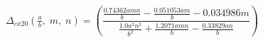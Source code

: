 \documentclass[11pt]{article}
\begin{document}
\begin{equation}
\label{eqd:cx20}
\Delta_{cx20}\!\left(\tfrac{a}{b},\; m,\; n\right) = \left(\frac{\frac{0.74362 a m n}{b} - \frac{0.051053 a m}{b} - 0.034986 m}{\frac{1.0 a^{2} n^{2}}{b^{2}} + \frac{1.2071 a m n}{b} - \frac{0.33829 a n}{b}}\right)
\end{equation}
\end{document}
